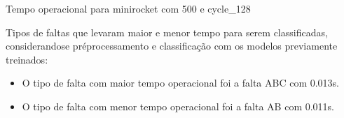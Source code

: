Tempo operacional para minirocket com 500 e cycle_128
\item Tipos de faltas que levaram maior e menor tempo para serem classificadas, considerando\hyph se pré\hyph processamento e classificação com os modelos previamente treinados:
\begin{itemize}
\item O tipo de falta com maior tempo operacional foi a falta ABC com 0.013s.
\item O tipo de falta com menor tempo operacional foi a falta AB com 0.011s.
\end{itemize}
